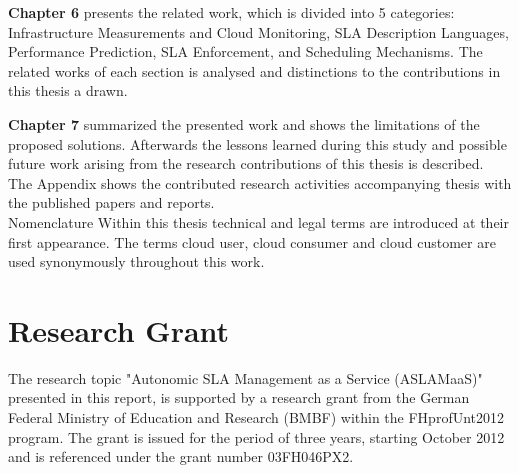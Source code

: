 \textbf{Chapter 6} presents the related work, which is divided into 5 categories: Infrastructure Measurements and Cloud Monitoring, SLA Description Languages, Performance Prediction, SLA Enforcement, and Scheduling Mechanisms. The related works of each section is analysed and distinctions to the contributions in this thesis a drawn.

\textbf{Chapter 7} summarized the presented work and shows the  limitations of the proposed solutions. Afterwards the lessons learned during this study and possible future work arising from the research contributions of this thesis is described.\\

The Appendix shows the contributed research activities accompanying thesis with the published papers and reports. \\

Nomenclature
Within this thesis technical and legal terms are introduced at their first appearance. 
The terms cloud user, cloud consumer and cloud customer are used synonymously throughout this work.


\section{Research Grant}
The research topic "Autonomic SLA Management as a Service (ASLAMaaS)" presented in this report, is supported by a research grant from the German Federal Ministry of Education and Research (BMBF) within the FHprofUnt2012 program. The grant is issued for the period of three years, starting October 2012 and is referenced under the grant number 03FH046PX2.\cite{ASLAMaaS}
